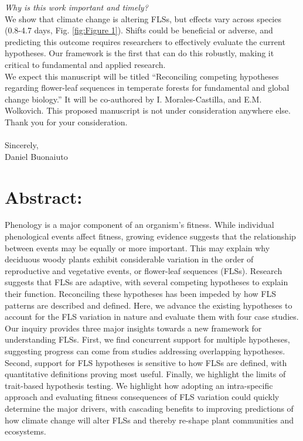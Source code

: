 \documentclass[11pt,a4paper]{article}
\begin{document}
\noindent \emph{Why is this work important and timely?}\\

\noindent We show that climate change is altering FLSs, but effects vary across species (0.8-4.7 days, Fig. \ref{fig:Figure 1}). Shifts could be beneficial or adverse, and predicting this outcome requires researchers to effectively evaluate the current hypotheses. Our framework is the first that can do this robustly, making it critical to fundamental and applied research.\\

 \noindent We expect this manuscript will be titled ``Reconciling competing hypotheses regarding flower-leaf sequences in temperate forests for fundamental and global change biology.'' It will be co-authored by I. Morales-Castilla, and E.M. Wolkovich. This proposed manuscript is not under consideration anywhere else. Thank you for your consideration.\\
\\Sincerely,\\

Daniel Buonaiuto
\newpage
\section*{Abstract:}
Phenology is a major component of an organism's fitness. While individual phenological events affect fitness, growing evidence suggests that the relationship between events may be equally or more important. This may explain why deciduous woody plants exhibit considerable variation in the order of reproductive and vegetative events, or flower-leaf sequences (FLSs). Research suggests that FLSs are adaptive, with several competing hypotheses to explain their function. Reconciling these hypotheses has been impeded by how FLS patterns are described and defined. Here, we advance the existing hypotheses to account for the FLS variation in nature and evaluate them with four case studies. Our inquiry provides three major insights towards a new framework for understanding FLSs. First, we find concurrent support for multiple hypotheses, suggesting progress can come from studies addressing overlapping hypotheses. Second, support for FLS hypotheses is sensitive to how FLSs are defined, with quantitative definitions proving most useful. Finally, we highlight the limits of trait-based hypothesis testing. We highlight how adopting an intra-specific approach and evaluating fitness consequences of FLS variation could quickly determine the major drivers, with cascading benefits to improving predictions of how climate change will alter FLSs and thereby re-shape plant communities and ecosystems. 
\end{document}
